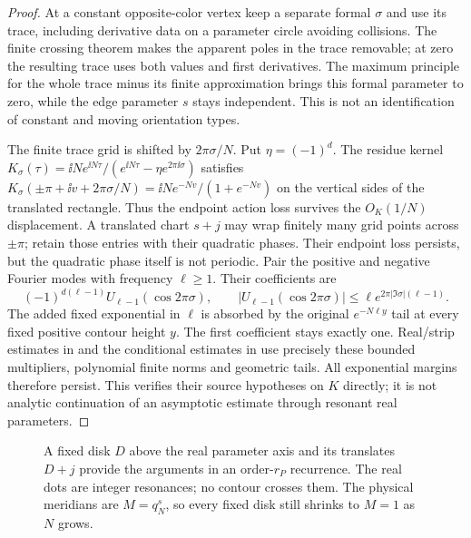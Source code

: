 \begin{proof}
At a constant opposite-color vertex keep a separate formal
$\sigma$ and use its trace, including derivative data on a parameter circle avoiding
collisions. The finite crossing theorem makes the apparent poles
in the trace removable; at zero the resulting trace uses both
values and first derivatives. The maximum principle for the whole trace
minus its finite approximation brings this formal parameter to
zero, while the edge parameter $s$ stays independent. This is not
an identification of constant and moving orientation types.

The finite trace grid is shifted by $2\pi\sigma/N$. Put
$\eta=(-1)^d$. The residue kernel
$K_\sigma(\tau)=\ii N e^{\ii N\tau}/(e^{\ii N\tau}-\eta e^{2\pi\ii\sigma})$
satisfies
$K_\sigma(\pm\pi+\ii v+2\pi\sigma/N)=\ii N e^{-Nv}/(1+e^{-Nv})$
on the vertical sides of the translated rectangle. Thus the
endpoint action loss survives the $O_K(1/N)$ displacement. A
translated chart $s+j$ may wrap finitely many grid points across
$\pm\pi$; retain those entries with their quadratic phases. Their endpoint
loss persists, but the quadratic phase itself is not periodic.
Pair the positive and negative Fourier modes with frequency
$\ell\ge1$. Their coefficients are
\begin{equation}\label{me:charge}
 (-1)^{d(\ell-1)}U_{\ell-1}(\cos2\pi\sigma),\qquad
 |U_{\ell-1}(\cos2\pi\sigma)|
       \le\ell e^{2\pi|\Im\sigma|(\ell-1)}.
\end{equation}
The added fixed exponential in $\ell$ is absorbed by the original
$e^{-N\ell y}$ tail at every fixed positive contour height $y$.
The first coefficient stays exactly one. Real/strip estimates
in \cite[Sections 2--6]{CircleTree} and the conditional estimates in
\cite[Sections 7.1--7.5]{CircleTree} use precisely these bounded
multipliers, polynomial finite norms and geometric tails. All
exponential margins therefore persist. This verifies their source
hypotheses on $K$ directly; it is not analytic continuation of
an asymptotic estimate through resonant real parameters.
\end{proof}

\begin{figure}[t]
\centering
\caption{A fixed disk $D$ above the real parameter axis and its
translates $D+j$ provide the arguments in an order-$r_P$ recurrence.
The real dots are integer resonances; no contour crosses them.
The physical meridians are $M=q_N^s$, so every fixed disk still
shrinks to $M=1$ as $N$ grows.}
\label{me:chart-figure}
\end{figure}

